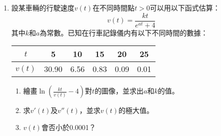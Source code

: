 \documentclass[12pt]{article}
\begin{document}
\begin{enumerate}
\begin{enumerate}
        \end{enumerate}
        \item 設某車輛的行駛速度$v(t)$在不同時間點$t>0$可以用以下函式估算：$$v(t)=\frac{kt}{e^{at}+4}$$ 其中$k$和$a$為常數。已知在行車記錄儀内有以下不同時間的數據：\begin{center}
            \begin{tabular}{|c|c|c|c|c|c|}
                \hline
                $t$&5&10&15&20&25\\
                \hline
                $v(t)$&30.90&6.56&0.83&0.09&0.01\\
                \hline
            \end{tabular}
        \end{center}\begin{enumerate}
            \item 繪畫$\displaystyle\ln(\frac{kt}{v(t)}-4)$對$t$的圖像，並求出$a$和$k$的值。
            \item 求$v'(t)$及$v''(t)$，並求$v(t)$的極大值。
            \item $v(t)$會否小於0.0001？
        \end{enumerate}
    \end{enumerate}
\end{document}

